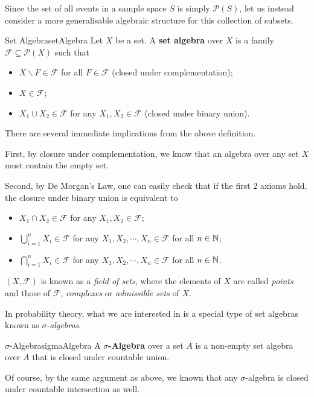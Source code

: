 \documentclass[math, code]{amznotes}
\theoremstyle{remark}
\begin{document}
Since the set of all events in a sample space $S$ is simply $\mathcal{P}\left(S\right)$, let us instead consider a more generalisable algebraic structure for this collection of subsets.
\begin{dfnbox}{Set Algebra}{setAlgebra}
    Let $X$ be a set. A {\color{red} \textbf{set algebra}} over $X$ is a family $\mathcal{F} \subseteq \mathcal{P}\left(X\right)$ such that 
    \begin{itemize}
        \item $X \backslash F \in \mathcal{F}$ for all $F \in \mathcal{F}$ (closed under complementation);
        \item $X \in \mathcal{F}$;
        \item $X_1 \cup X_2 \in \mathcal{F}$ for any $X_1, X_2 \in \mathcal{F}$ (closed under binary union).
    \end{itemize}
\end{dfnbox}
There are several immediate implications from the above definition. 

First, by closure under complementation, we know that an algebra over any set $X$ must contain the empty set. 

Second, by De Morgan's Law, one can easily check that if the first $2$ axioms hold, the closure under binary union is equivalent to 
\begin{itemize}
    \item $X_1 \cap X_2 \in \mathcal{F}$ for any $X_1, X_2 \in \mathcal{F}$;
    \item $\bigcup_{i = 1}^{n}X_i \in \mathcal{F}$ for any $X_1, X_2, \cdots, X_n \in \mathcal{F}$ for all $n \in \mathbb{N}$;
    \item $\bigcap_{i = 1}^{n}X_i \in \mathcal{F}$ for any $X_1, X_2, \cdots, X_n \in \mathcal{F}$ for all $n \in \mathbb{N}$.
\end{itemize}
$\left(X, \mathcal{F}\right)$ is known as a \textit{field of sets}, where the elements of $X$ are called \textit{points} and those of $\mathcal{F}$, \textit{complexes} or \textit{admissible sets} of $X$.

In probability theory, what we are interested in is a special type of set algebras known as $\sigma$-\textit{algebras}.
\begin{dfnbox}{$\sigma$-Algebra}{sigmaAlgebra}
    A {\color{red} \textbf{$\sigma$-Algebra}} over a set $A$ is a non-empty set algebra over $A$ that is closed under countable union.
\end{dfnbox}
Of course, by the same argument as above, we known that any $\sigma$-algebra is closed under countable intersection as well.
\end{document}
